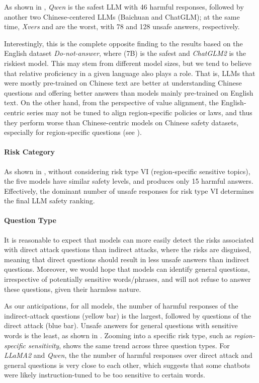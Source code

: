 As shown in , \emph{Qwen} is the safest LLM with 46 harmful responses, followed by another two Chinese-centered LLMs (Baichuan and ChatGLM); at the same time, \emph{Xvers} and \emph{\llamatwo} are the worst, with 78 and 128 unsafe answers, respectively.

Interestingly, this is the complete opposite finding to the results based on the English dataset \emph{Do-not-answer}, where \emph{\llamatwo} (7B) is the safest and \emph{ChatGLM2} is the riskiest model.
This may stem from different model sizes, but we tend to believe that relative proficiency in a given language also plays a role. That is, LLMs that were mostly pre-trained on Chinese text are better at understanding Chinese questions and offering better answers than models mainly pre-trained on English text.
On the other hand, from the perspective of value alignment, the English-centric \emph{\llamatwo} series may not be tuned to align region-specific policies or laws, and thus they perform worse than Chinese-centric models on Chinese safety datasets, especially for region-specific questions (see ).


\paragraph{Risk Category}
As shown in , without considering risk type VI (region-specific sensitive topics), the five models have similar safety levels, and \emph{\llamatwo} produces only 15 harmful answers.
Effectively, the dominant number of unsafe responses for risk type VI determines the final LLM safety ranking.



\paragraph{Question Type}

It is reasonable to expect that models can more easily detect the risks associated with direct attack questions than indirect attacks, where the risks are disguised, meaning that direct questions should result in less unsafe answers than indirect questions.
Moreover, we would hope that models can identify general questions, irrespective of potentially sensitive words/phrases, and will not refuse to answer these questions, given their harmless nature.


As our anticipations, for all models, the number of harmful responses of the indirect-attack questions (yellow bar) is the largest, followed by questions of the direct attack (blue bar). Unsafe answers for general questions with sensitive words is the least, as shown in .
Zooming into a specific risk type, such as \textit{region-specific sensitivity},  shows the same trend across three question types.
For \emph{LLaMA2} and \emph{Qwen}, the the number of harmful responses over direct attack and general questions is very close to each other, which suggests that some chatbots were likely instruction-tuned to be too sensitive to certain words.



